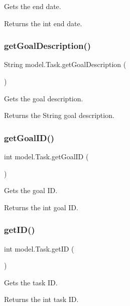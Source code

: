 Gets the end date. \begin{DoxyReturn}{Returns}
the int end date. 
\end{DoxyReturn}
\mbox{\label{classmodel_1_1_task_a72d577693ab1c7f7076b85b630b83346}} 
\subsubsection{get\+Goal\+Description()}
{\footnotesize\ttfamily String model.\+Task.\+get\+Goal\+Description (\begin{DoxyParamCaption}{ }\end{DoxyParamCaption})}

Gets the goal description. \begin{DoxyReturn}{Returns}
the String goal description. 
\end{DoxyReturn}
\mbox{\label{classmodel_1_1_task_ad15a864530e3510c0ecf56177b3dca7c}} 
\subsubsection{get\+Goal\+I\+D()}
{\footnotesize\ttfamily int model.\+Task.\+get\+Goal\+ID (\begin{DoxyParamCaption}{ }\end{DoxyParamCaption})}

Gets the goal ID. \begin{DoxyReturn}{Returns}
the int goal ID. 
\end{DoxyReturn}
\mbox{\label{classmodel_1_1_task_aafb4129287eec41ca30df2845e991e17}} 
\subsubsection{get\+I\+D()}
{\footnotesize\ttfamily int model.\+Task.\+get\+ID (\begin{DoxyParamCaption}{ }\end{DoxyParamCaption})}

Gets the task ID. \begin{DoxyReturn}{Returns}
the int task ID. 
\end{DoxyReturn}
\mbox{\label{classmodel_1_1_task_a14c4d1d8b9882102334f9e83d2cf136b}} 
